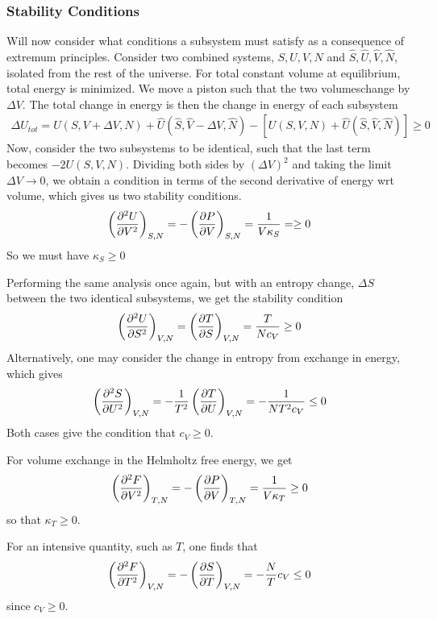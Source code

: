 \documentclass[a4paper, english, 12pt]{article}
\newcommand{\closed}[1]{\left( #1 \right)}
\begin{document}
\begin{multicols*}{2}
\subsubsection*{\scriptsize Stability Conditions}
Will now consider what conditions a subsystem must satisfy as a consequence of extremum principles. Consider two combined systems, $S,U,V,N$ and $\hat{S},\hat{U},\hat{V},\hat{N}$, isolated from the rest of the universe. For total constant volume at equilibrium, total energy is minimized. We move a piston such that the two volumeschange by $\Delta V$. The total change in energy is then the change in energy of each subsystem 
\begin{align*}
    \Delta U_{tot} = U(S,V+\Delta V,N) + \hat{U}(\hat{S},\hat{V}-\Delta V,\hat{N}) - [U(S,V,N) + \hat{U}(\hat{S},\hat{V},\hat{N})] \geq 0
\end{align*} 
Now, consider the two subsystems to be identical, such that the last term becomes $-2U(S,V,N)$. Dividing both sides by $(\Delta V)^2$ and taking the limit $\Delta V\to0$, we obtain a condition in terms of the second derivative of energy wrt volume, which gives us two stability conditions. 
\begin{align*}
    \closed{\pdv[2]{U}{V}}_{S,N} = -\closed{\pdv{P}{V}}_{S,N} = \frac{1}{V\kappa_S} =  \geq0 
\end{align*} 
So we must have $\kappa_S \geq0$

Performing the same analysis once again, but with an entropy change, $\Delta S$ between the two identical subsystems, we get the stability condition 
\begin{align*}
    \closed{\pdv[2]{U}{S}}_{V,N} = \closed{\pdv{T}{S}}_{V,N} = \frac{T}{N c_V} \geq 0 
\end{align*}
Alternatively, one may consider the change in entropy from exchange in energy, which gives 
\begin{align*}
    \closed{\pdv[2]{S}{U}}_{V,N} = -\frac{1}{T^2} \closed{\pdv{T}{U}}_{V,N} = - \frac{1}{N T^2 c_V} \leq 0
\end{align*} 
Both cases give the condition that $c_V\geq0$. 

For volume exchange in the Helmholtz free energy, we get 
\begin{align*}
    \closed{\pdv[2]{F}{V}}_{T,N} = -\closed{\pdv{P}{V}}_{T,N} = \frac{1}{V \kappa_T} \geq 0 
\end{align*}
so that $\kappa_T \geq 0$. 

For an intensive quantity, such as $T$, one finds that 
\begin{align*}
    \closed{\pdv[2]{F}{T}}_{V,N} = -\closed{\pdv{S}{T}}_{V,N} = -\frac{N}{T}c_V \leq 0 
\end{align*} 
since $c_V\geq0$. 


\end{multicols*}
\end{document}
